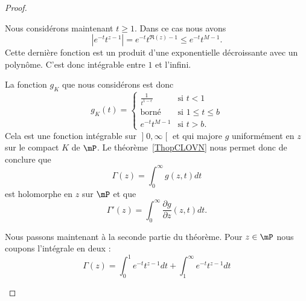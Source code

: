 \begin{proof}
\begin{subproof}
			Nous considérons maintenant \( t\geq 1\). Dans ce cas nous avons
			\begin{equation}
				|  e^{-t}t^{z-1} |= e^{-t}t^{\Re(z)-1}\leq  e^{-t}t^{M-1}.
			\end{equation}
			Cette dernière fonction est un produit d'une exponentielle décroissante avec un polynôme. C'est donc intégrable entre \( 1\) et l'infini.

			La fonction \( g_K\) que nous considérons est donc
			\begin{equation}
				g_K(t)=\begin{cases}
					\frac{1}{ t^{1-\epsilon} } & \text{si } t<1           \\
					\text{borné}               & \text{si } 1\leq t\leq b \\
					e^{-t}t^{M-1}              & \text{si } t>b.
				\end{cases}
			\end{equation}
			Cela est une fonction intégrable sur \( \mathopen] 0,    \infty \mathclose[\) et qui majore \( g\) uniformément en \( z\) sur le compact \( K\) de \( \mP\). Le théorème~\ref{ThopCLOVN} nous permet donc de conclure que
		\begin{equation}
			\Gamma(z)=\int_0^{\infty}g(z,t)dt
		\end{equation}
		est holomorphe en \( z\) sur \( \mP\) et que
		\begin{equation}
			\Gamma'(z)=\int_0^{\infty}\frac{ \partial g }{ \partial z }(z,t)dt.
		\end{equation}

		 Nous passons maintenant à la seconde partie du théorème. Pour \( z\in \mP\) nous coupons l'intégrale en deux :
		\begin{equation}
			\Gamma(z)=\int_0^1 e^{-t}t^{z-1}dt+\int_1^{\infty} e^{-t}t^{z-1}dt
		\end{equation}


\end{subproof}
\end{proof}
